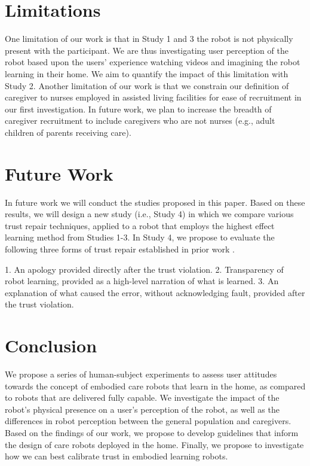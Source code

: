 \documentclass[letterpaper]{article} %
\begin{document}
\section{Limitations}
\label{sec:limitations}
One limitation of our work is that in Study 1 and 3 the robot is not physically present with the participant. We are thus investigating user perception of the robot based upon the users' experience watching videos and imagining the robot learning in their home. We aim to quantify the impact of this limitation with Study 2.  Another limitation of our work is that we constrain our definition of caregiver to nurses employed in assisted living facilities for ease of recruitment in our first investigation. In future work, we plan to increase the breadth of caregiver recruitment to include caregivers who are not nurses (e.g., adult children of parents receiving care). %


\vspace{-1.84mm}
\section{Future Work}
\label{sec:futurework}
In future work we will conduct the studies proposed in this paper. Based on these results, we will design a new study (i.e., Study 4) in which we compare various trust repair techniques, applied to a robot that employs the highest effect learning method from Studies 1-3. In Study 4, we propose to evaluate the following three forms of trust repair established in prior work \cite{de_visser_towards_2020, baker_toward_2018, robinette_timing_2015, kim_repairing_2013}.

\begin{enumerate}
1. An apology provided directly after the trust violation.
2. Transparency of robot learning, provided as a high-level narration of what is learned.
3. An explanation of what caused the error, without acknowledging fault, provided after the trust violation.
\end{enumerate}

\section{Conclusion}
\label{sec:conclusion}
We propose a series of human-subject experiments to assess user attitudes towards the concept of embodied care robots that learn in the home, as compared to robots that are delivered fully capable. We investigate the impact of the robot's physical presence on a user's perception of the robot, as well as the differences in robot perception between the general population and caregivers. Based on the findings of our work, we propose to develop guidelines that inform the design of care robots deployed in the home. Finally, we propose to investigate how we can best calibrate trust in embodied learning robots.
\end{document}
